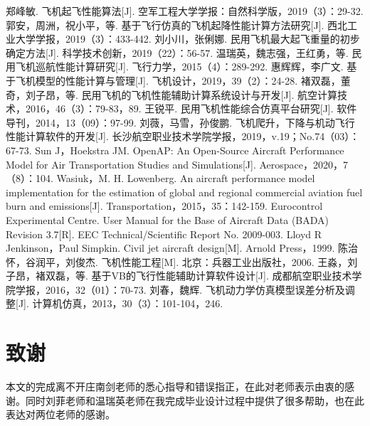 \documentclass[a4paper,punct,space,heading=true,AutoFakeBold]{ctexrep}
\begin{document}
\begin{thebibliography}{10}
\markboth{}{}
郑峰敏. 飞机起飞性能算法[J]. 空军工程大学学报：自然科学版，2019（3）：29-32.
郭安，周洲，祝小平，等. 基于飞行仿真的飞机起降性能计算方法研究[J]. 西北工业大学学报，2019（3）：433-442.
刘小川，张俐娜. 民用飞机最大起飞重量的初步确定方法[J]. 科学技术创新，2019（22）：56-57.
温瑞英，魏志强，王红勇，等. 民用飞机巡航性能计算研究[J]. 飞行力学，2015（4）：289-292.
惠辉辉，李广文. 基于飞机模型的性能计算与管理[J]. 飞机设计，2019，39（2）：24-28.
褚双磊，董奇，刘子昂，等. 民用飞机的飞机性能辅助计算系统设计与开发[J]. 航空计算技术，2016，46（3）：79-83，89.
王锐平. 民用飞机性能综合仿真平台研究[J]. 软件导刊，2014，13（09）：97-99.
刘薇，马雪，孙俊鹏. 飞机爬升，下降与机动飞行性能计算软件的开发[J]. 长沙航空职业技术学院学报，2019，v.19；No.74（03）：67-73.
Sun J，Hoekstra JM. OpenAP: An Open-Source Aircraft Performance Model for Air Transportation Studies and Simulations[J]. Aerospace，2020，7（8）：104.
Wasiuk，M. H. Lowenberg. An aircraft performance model implementation for the estimation of global and regional commercial aviation fuel burn and emissions[J]. Transportation，2015，35：142-159.
Eurocontrol Experimental Centre. User Manual for the Base of Aircraft Data (BADA) Revision 3.7[R]. EEC Technical/Scientific Report No. 2009-003.
Lloyd R Jenkinson，Paul Simpkin. Civil jet aircraft design[M]. Arnold Press，1999.
陈治怀，谷润平，刘俊杰. 飞机性能工程[M]. 北京：兵器工业出版社，2006.
王淼，刘子昂，褚双磊，等. 基于VB的飞行性能辅助计算软件设计[J]. 成都航空职业技术学院学报，2016，32（01）：70-73.
刘春，魏辉. 飞机动力学仿真模型误差分析及调整[J]. 计算机仿真，2013，30（3）：101-104，246.


\end{thebibliography}


\thispagestyle{plain}
\chapter*{致\qquad 谢}
\markboth{}{}
本文的完成离不开庄南剑老师的悉心指导和错误指正，在此对老师表示由衷的感谢。同时刘菲老师和温瑞英老师在我完成毕业设计过程中提供了很多帮助，也在此表达对两位老师的感谢。
\end{document}
